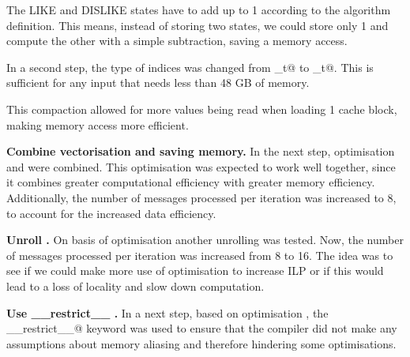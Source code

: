 \documentclass[final,letterpaper]{article}
\newcommand{\mypar}[1]{{\bf #1.}}
\begin{document}
The LIKE and DISLIKE states have to add up to 1 according to the algorithm definition. This means, instead of storing two states, we could store only 1 and compute the other with a simple subtraction, saving a memory access.

In a second step, the type of indices was changed from \verb@size_t@ to _t@. This is sufficient for any input that needs less than 48 GB of memory. 


This compaction allowed for more values being read when loading 1 cache block, making memory access more efficient.


\mypar{Combine vectorisation and saving memory}
In the next step, optimisation  and  were combined. This optimisation was expected to work well together, since it combines greater computational efficiency with greater memory efficiency. Additionally, the number of messages processed per iteration was increased to 8, to account for the increased data efficiency.


\mypar{Unroll }
On basis of optimisation  another unrolling was tested. Now, the number of messages processed per iteration was increased from 8 to 16. The idea was to see if we could make more use of optimisation  to increase ILP or if this would lead to a loss of locality and slow down computation.


\mypar{Use \_\_restrict\_\_ }
In a next step, based on optimisation , the \verb@__restrict__@ keyword was used to ensure that the compiler did not make any assumptions about memory aliasing and therefore hindering some optimisations.

%
%
%
%
\end{document}
